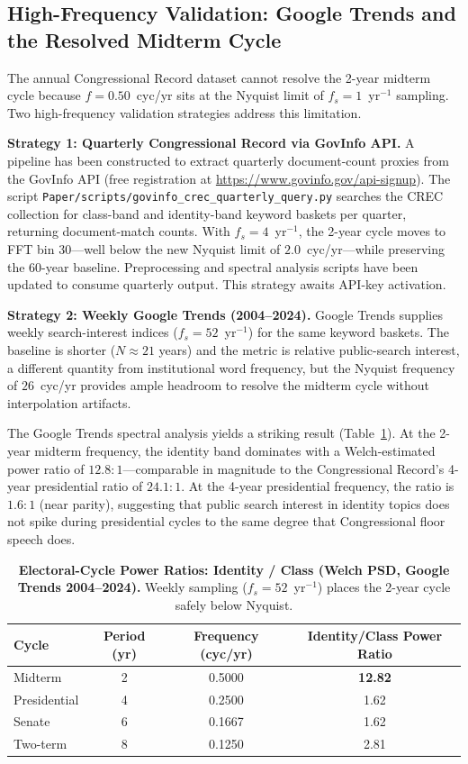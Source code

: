 \subsection{High-Frequency Validation: Google Trends and the Resolved Midterm Cycle}
\label{sec:high_freq_validation}

The annual Congressional Record dataset cannot resolve the 2-year midterm cycle because $f = 0.50$~cyc/yr sits at the Nyquist limit of $f_s = 1$~yr$^{-1}$ sampling. Two high-frequency validation strategies address this limitation.

\textbf{Strategy 1: Quarterly Congressional Record via GovInfo API.} A pipeline has been constructed to extract quarterly document-count proxies from the GovInfo API (free registration at \url{https://www.govinfo.gov/api-signup}). The script \texttt{Paper/scripts/govinfo\_crec\_quarterly\_query.py} searches the CREC collection for class-band and identity-band keyword baskets per quarter, returning document-match counts. With $f_s = 4$~yr$^{-1}$, the 2-year cycle moves to FFT bin 30---well below the new Nyquist limit of $2.0$~cyc/yr---while preserving the 60-year baseline. Preprocessing and spectral analysis scripts have been updated to consume quarterly output. This strategy awaits API-key activation.

\textbf{Strategy 2: Weekly Google Trends (2004--2024).} Google Trends supplies weekly search-interest indices ($f_s = 52$~yr$^{-1}$) for the same keyword baskets. The baseline is shorter ($N \approx 21$ years) and the metric is relative public-search interest, a different quantity from institutional word frequency, but the Nyquist frequency of $26$~cyc/yr provides ample headroom to resolve the midterm cycle without interpolation artifacts.

The Google Trends spectral analysis yields a striking result (Table~\ref{tab:spectral_ratios_google}). At the 2-year midterm frequency, the identity band dominates with a Welch-estimated power ratio of $12.8:1$---comparable in magnitude to the Congressional Record's 4-year presidential ratio of $24.1:1$. At the 4-year presidential frequency, the ratio is $1.6:1$ (near parity), suggesting that public search interest in identity topics does not spike during presidential cycles to the same degree that Congressional floor speech does.

\begin{table}[htbp]
\centering
\caption{\textbf{Electoral-Cycle Power Ratios: Identity / Class (Welch PSD, Google Trends 2004--2024).} Weekly sampling ($f_s = 52$~yr$^{-1}$) places the 2-year cycle safely below Nyquist.}
\label{tab:spectral_ratios_google}
\begin{tabular}{lccc}
\toprule
Cycle & Period (yr) & Frequency (cyc/yr) & Identity/Class Power Ratio \\
\midrule
Midterm & 2 & 0.5000 & \textbf{12.82} \\
Presidential & 4 & 0.2500 & 1.62 \\
Senate & 6 & 0.1667 & 1.62 \\
Two-term & 8 & 0.1250 & 2.81 \\
\bottomrule
\end{tabular}
\end{table}

